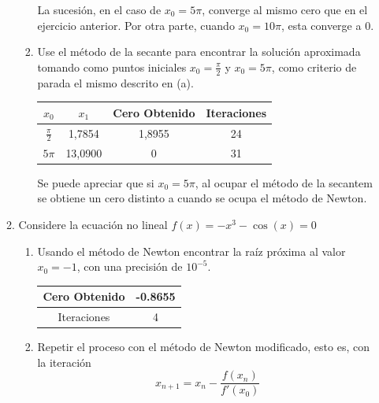\documentclass{udparticle}
\begin{document}
\begin{enumerate}
\begin{enumerate}
\begin{enumerate}
La sucesión, en el caso de $x_{0}=5\pi$, converge al mismo cero que en el ejercicio anterior. Por otra parte, cuando $x_{0}=10\pi$, esta converge a 0.

	\item Use el método de la secante para encontrar la solución aproximada tomando como puntos iniciales $x_{0}=\frac{\pi}{2}$ y $x_{0}=5\pi$, como criterio de parada el mismo descrito en (a).
	\begin{table} [H]
			\centering
			\begin{tabular}{|c|c|c|c|}
				\hline
				$x_{0}$& $x_{1}$ & Cero Obtenido & Iteraciones\\
				\hline
				$\frac{\pi}{2}$ & 1,7854 & 1,8955 & 24 \\
				\hline 
				$5\pi$& 13,0900 & 0 & 31\\
				\hline
			\end{tabular}
		\end{table}
		
Se puede apreciar que si $x_{0}=5\pi$, al ocupar el método de la secantem se obtiene un cero distinto a cuando se ocupa el método de Newton.	
	\end{enumerate}
		

\item Considere la ecuación no lineal $f(x) = -x^{3} - \cos(x) = 0$
    \begin{enumerate}
    
        \item Usando el método de Newton encontrar la raíz próxima al valor $x_{0}=-1$, con una precisión de $10^{-5}$.\\
        \begin{table}[H]
        \centering
        \begin{tabular} { |c|c|}
        
        \hline
        Cero Obtenido &  -0.8655\\
        \hline
        Iteraciones   &    4\\
        \hline
        
        \end{tabular}
        \end{table}
        
        \item Repetir el proceso con el método de Newton modificado, esto es, con la iteración $$x_{n+1} = x_{n} - \frac {f(x_{n})} {f'(x_{0})} $$
        \begin{table}[H]
        \centering
        \begin{tabular} { |c|c|}
        

\end{tabular}
\end{table}
\end{enumerate}
\end{enumerate}
\end{enumerate}
\end{document}
